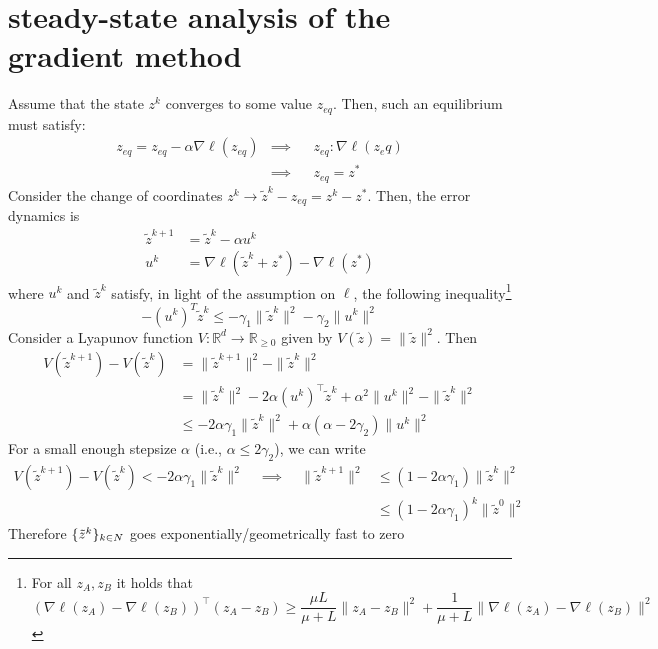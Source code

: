 \documentclass{book}
\newcommand{\R}{\mathbb{R}}
\newcommand{\N}{\mathbb{N}}
\theoremstyle{theoremv2}
\theoremstyle{defv2}
\theoremstyle{remark}
\theoremstyle{remark}
\theoremstyle{definition}
\theoremstyle{definition}
\begin{document}
\section{steady-state analysis of the gradient method}
Assume that the state $z^k$ converges to some value $z_{eq}$. Then, such an equilibrium must satisfy: 
\begin{align*}
    z_{eq} = z_{eq}-\alpha\nabla\ell(z_{eq}) & \implies && z_{eq}:\nabla\ell(z_eq)\\ 
     & \implies && z_{eq} = z^*
\end{align*}
Consider the change of coordinates $z^k\to \tilde{z}^k-z_{eq}=z^k-z^*$. Then, the error dynamics is  
\begin{align*}
    \tilde{z}^{k+1} &= \tilde{z}^k-\alpha u^k \\
     u^k &= \nabla\ell(\tilde{z}^k+z^*)-\nabla\ell(z^*)
\end{align*}
where $u^k$ and $\tilde{z}^k$ satisfy, in light of the assumption on $\ell$, the following inequality\footnote{For all $z_A,z_B$ it holds that $$
    \left(\nabla\ell(z_A)-\nabla\ell(z_B)\right)^\top (z_A-z_B)\geq \displaystyle\frac{\mu L }{\mu + L} \|z_A - z_B\|^2 + \displaystyle\frac{1}{\mu + L}\|\nabla\ell(z_A)-\nabla\ell(z_B)\|^2
$$ } 
\[
    -(u^k)^T\tilde{z}^k \leq -\gamma_1\|\tilde{z}^k\|^2-\gamma_2\|u^k\|^2
\]
Consider a Lyapunov function $V:\R^d\to \R_{\geq0}$ given by $V(\tilde{z})=\|\tilde{z}\|^2$. Then 
\begin{align*}
    V(\tilde{z}^{k+1})-V(\tilde{z}^k) &= \|\tilde{z}^{k+1}\|^2-\|\tilde{z}^k\|^2\\
    &= \|\tilde{z}^k\|^2 - 2\alpha(u^k)^\top\tilde{z}^k+\alpha^2\|u^k\|^2-\|\tilde{z}^k\|^2\\ 
    &\leq -2\alpha\gamma_1 \|\tilde{z}^k\|^2 + \alpha(\alpha-2\gamma_2)\|u^k\|^2
\end{align*}
For a small enough stepsize $\alpha$ (i.e., $\alpha\leq 2\gamma_2$), we can write 
\begin{align*}
    V(\tilde{z}^{k+1})-V(\tilde{z}^k)<-2\alpha\gamma_1\|\tilde{z}^k\|^2 \quad \implies \quad \|\tilde{z}^{k+1}\|^2 & \leq (1-2\alpha\gamma_1) \|\tilde{z}^k\|^2\\ 
    & \leq (1-2\alpha\gamma_1)^k\|\tilde{z}^0\|^2
\end{align*}
Therefore $\{\tilde{z}^k\}_{k\in\\N}$ goes exponentially/geometrically fast to zero
\end{document}
